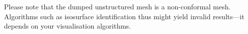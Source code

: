 \noindent
Please note that the dumped unstructured mesh is a non-conformal mesh. 
Algorithms such as isosurface identification thus might yield invalid
results---it depends on your visualisation algorithms.


% 
% 
% 
% 
% 
% 
% 
% 
% 
% 
% 
% 
% 
% 
% 
% 
% 
% 
% 
% 
% 
% 
% 
% 
% 
% 
% 


